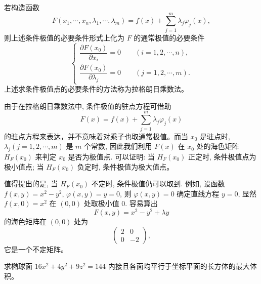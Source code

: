 \documentclass[UTF8,12pt,a4paper,fontset=fandol]{ctexart}
\begin{document}
\begin{remark}\quad 若构造函数
\[
  F(x_1,\cdots,x_n,\lambda_1,\cdots,\lambda_m)
  =
  f(x)+\sum_{j=1}^m\lambda_j\varphi_j(x),
\]
则上述条件极值的必要条件形式上化为 $F$ 的通常极值的必要条件
\begin{equation}
  \begin{cases}
    \dfrac{\partial F(x_0)}{\partial x_i}=0
    \qquad (i=1,2,\cdots,n),\\[1.2ex]
    \dfrac{\partial F(x_0)}{\partial\lambda_j}=0
    \qquad (j=1,2,\cdots,m).
  \end{cases}
\label{course-eq-14-5-9}
\end{equation}
上述求条件极值点的必要条件的方法称为拉格朗日乘数法。

由于在拉格朗日乘数法中, 条件极值的驻点方程可借助
\[
  F(x)=f(x)+\sum_{j=1}^m\lambda_j\varphi_j(x)
\]
的驻点方程来表达，并不意味着对乘子也取通常极值。而当 $x_0$ 是驻点时, $\lambda_j(j=1,2,\cdots,m)$ 是 $m$ 个常数, 因此我们利用 $F(x)$ 在 $x_0$ 处的海色矩阵 $H_F(x_0)$ 来判定 $x_0$ 是否为极值点. 可以证明: 当 $H_F(x_0)$ 正定时, 条件极值点为极小值点; 当 $H_F(x_0)$ 负定时, 条件极值为极大值点。

值得提出的是, 当 $H_F(x_0)$ 不定时, 条件极值仍可以取到. 例如, 设函数 $f(x,y)=x^2-y^2$, $\varphi(x,y)=y=0$, 则 $\varphi(x,y)=0$ 确定直线方程 $y=0$, 显然 $f(x,0)=x^2$ 在 $(0,0)$ 处取极小值 $0$. 容易算出
\[
  F(x,y)=x^2-y^2+\lambda y
\]
的海色矩阵在 $(0,0)$ 处为
\[
  \begin{pmatrix}
    2 & 0\\
    0 & -2
  \end{pmatrix},
\]
它是一个不定矩阵。

\end{remark}
\begin{example}\label{course-example-14-5-4}\quad 求椭球面 $16x^2+4y^2+9z^2=144$ 内接且各面均平行于坐标平面的长方体的最大体积。

\end{example}
\end{document}
